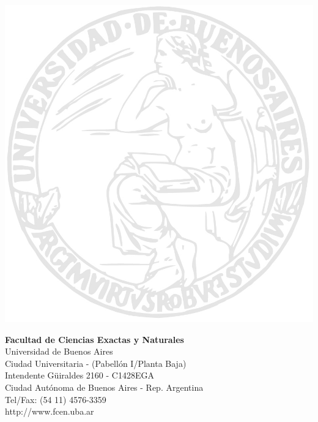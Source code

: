 {    \medskip%
    \begin{center}
        \ifx\Grupo\relax\else\textbf{\Grupo}\par\bigskip\fi
        \tablaints
    \end{center}%
    \vfill%
%
    \begin{minipage}[t]{\textwidth}
        \begin{minipage}[t]{.55 \textwidth}
            \includegraphics{logo_uba.jpg}
        \end{minipage}%
        \begin{minipage}[b]{.50 \textwidth}
            \textbf{\textsf{Facultad de Ciencias Exactas y Naturales}} \\
            \textsf{Universidad de Buenos Aires} \\
            {\scriptsize %
            Ciudad Universitaria - (Pabell\'on I/Planta Baja) \\
                Intendente G\"uiraldes 2160 - C1428EGA \\
            Ciudad Autónoma de Buenos Aires - Rep. Argentina \\
                Tel/Fax: (54 11) 4576-3359 \\
            http://www.fcen.uba.ar \\
            }
        \end{minipage}
    \end{minipage}%
%
    \newpage}

